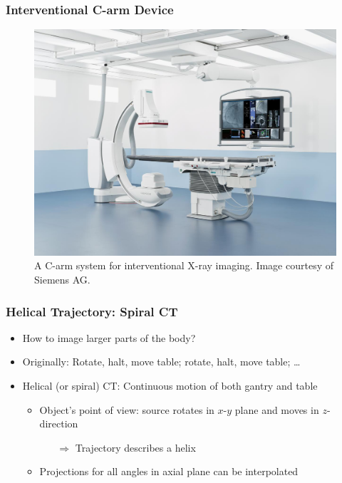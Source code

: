\begin{frame}
	\frametitle{Interventional C-arm Device}

	\begin{figure}[tbp]
		\centering
		\includegraphics[height=0.8\textheight]{images/c-arm}
		\caption{A C-arm system for interventional X-ray imaging. Image courtesy of Siemens AG.}
		\label{fig:ct_geom_2}
	\end{figure}

\end{frame}

\begin{frame}
	\frametitle{Helical Trajectory: Spiral CT}

	\begin{itemize}
		\setlength\itemsep{0.3cm}
		\item How to image larger parts of the body?
		\item Originally: Rotate, halt, move table; rotate, halt, move table; \ldots
		\item Helical (or spiral) CT: Continuous motion of both gantry and table

		      \hspace{0.1cm}
		      \begin{itemize}
			      \setlength\itemsep{0.2cm}
			      \item Object's point of view: source rotates in $x$-$y$ plane and moves in $z$-direction
			            \begin{itemize}
				            \item[$\Rightarrow$] Trajectory describes a helix
			            \end{itemize}
			      \item Projections for all angles in axial plane can be interpolated

		      \end{itemize}

	\end{itemize}

\end{frame}

